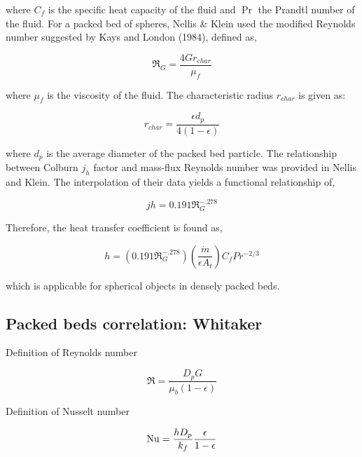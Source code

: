 where $C_f$ is the specific heat capacity of the fluid and $\Pr$ the Prandtl number of the fluid. For a packed bed of spheres, Nellis \& Klein used the modified Reynolds number suggested by Kays and London (1984), defined as,

\begin{equation}
	\Re_G=\frac{4 G r_{char}}{\mu_f}
\end{equation}

where $\mu_f$ is the viscosity of the fluid.  The characteristic radius $r_{char}$ is given as:

\begin{equation}
	r_{char}=\frac{\epsilon d_p}{4(1-\epsilon)}
\end{equation}

where $d_p$ is the average diameter of the packed bed particle. The relationship between Colburn $j_h$ factor and mass-flux Reynolds number was provided in Nellis and Klein. The interpolation of their data yields a functional relationship of,

\begin{equation}
	jh=0.191 \Re_G^{-.278}
\end{equation}

Therefore, the heat transfer coefficient is found as,

\begin{equation}
	h=(0.191 \Re_G^{-.278}) (\frac{\dot{m}}{\epsilon A_t}) C_f Pr^{-2/3}
\end{equation}

which is applicable for spherical objects in densely packed beds.





\subsection{Packed beds correlation: Whitaker}

Definition of Reynolds number

\begin{equation}
	\Re = \frac{D_p G}{\mu_b(1-\epsilon)}
\end{equation}

Definition of Nusselt number

\begin{equation}
	\mathrm{Nu} = \frac{hD_p}{k_f}\frac{\epsilon}{1-\epsilon}
\end{equation}

